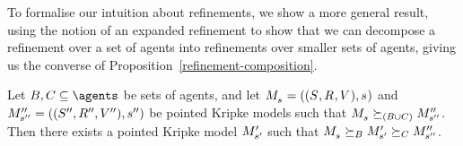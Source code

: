 To formalise our intuition about refinements, we show a more general result, using the notion of an expanded refinement to show that we can decompose a refinement over a set of agents into refinements over smaller sets of agents, giving us the converse of Proposition~\ref{refinement-composition}.

\begin{proposition}\label{refinement-decomposition}
Let $\agentsB, \agentsC \subseteq \agents$ be sets of agents, and let $\kPModelAndTuple{\kStateS}$ and $\kPModelAndTuplePP{\kStateSPP}$ be pointed Kripke models such that $\kPModel{\kStateS} \simulates[(\agentsB \cup \agentsC)] \kPModelPP{\kStateSPP}$.
Then there exists a pointed Kripke model ${M^{\prime}_{{s}^{\prime}}}$ such that $\kPModel{\kStateS} \simulatesBs \kPModelP{\kStateSP} \simulatesCs \kPModelPP{\kStateSPP}$.
\end{proposition}

